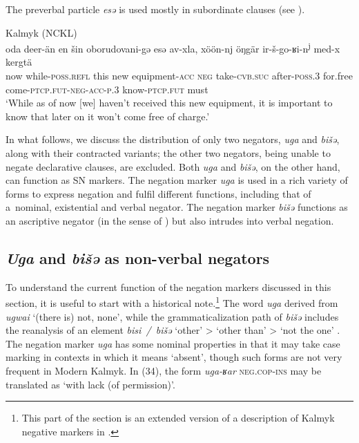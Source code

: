 \documentclass[output=paper]{langsci/langscibook}
\begin{document}
The preverbal particle \textit{esǝ} is used mostly in subordinate clauses (see \citealp{baranova2019a}).

\ea Kalmyk (NCKL) \label{ex:BK33}\\
	\gll oda	deer-än			en		šin		oborudovani-gə	esə	av-xla,			xöön-nj	öŋgär	ir-š-go-ʁi-n\textsuperscript{j}	med-x				kergtä\\
	now	while-\textsc{poss.refl}	this	new	equipment-\textsc{acc}	\textsc{neg}	take-\textsc{cvb.suc}	after-\textsc{poss.3}	for.free	come-\textsc{ptcp.fut-neg-acc-p.3}	know-\textsc{ptcp.fut}	must\\
	\glt `While as of now [we] haven’t received this new equipment, it is important to know that later on it won’t come free of charge.'
\z


In what follows, we discuss the distribution of only two negators, \textit{uga} and \textit{bišǝ}, along with their contracted variants; the other two negators, being unable to negate declarative clauses, are excluded. Both \textit{uga} and \textit{bišǝ}, on the other hand, can function as SN markers. The negation marker \textit{uga} is used in a rich variety of forms to express negation and fulfil different functions, including that of a nominal, existential and verbal negator. The negation marker \textit{bišǝ} functions as an ascriptive negator (in the sense of \citealp{Veselinova2015}) but also intrudes into verbal negation.

\subsection{\textit{Uga} and \textit{bišǝ} as non-verbal negators}\label{sec:BK3.2}

To understand the current function of the negation markers discussed in this section, it is useful to start with a historical note.\footnote{This part of the section is an extended version of a description of Kalmyk negative markers in \citet{baranova2015a}.} The word \textit{uga} derived from \textit{ugwai} ‘(there is) not, none’, while the grammaticalization path of \textit{bišǝ} includes the reanalysis of an element \textit{bisi / bišǝ} ‘other’ > ‘other than’ > ‘not the one’ \citep[250–251]{janhunen2012a}. The negation marker \textit{uga} has some nominal properties in that it may take case marking in contexts in which it means ‘absent’, though such forms are not very frequent in Modern Kalmyk. In (34), the form \textit{uga-ʁar} \textsc{neg.cop-ins} may be translated as ‘with lack (of permission)’.
\end{document}
